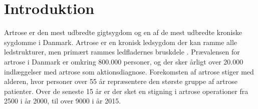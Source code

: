 
\raggedbottom



 \clearpage


\chapter{Introduktion}\vspace{-0.75cm}
Artrose er den mest udbredte gigtsygdom og en af de mest udbredte kroniske sygdomme i Danmark. 
Artrose er en kronisk ledsygdom der kan ramme alle ledstrukturer, men primært rammes ledfladernes bruskdele \citep{schroder}. Prævalensen for artrose i Danmark er omkring 800.000 personer, og der sker årligt over 20.000 indlæggelser med artrose som aktionsdiagnose. \citep{sygdom}
Forekomsten af artrose stiger med alderen, hvor personer over 55 år repræsentere den største gruppe af artrose patienter. Over de seneste 15 år er der sket en stigning i artrose operationer fra 2500 i år 2000, til over 9000 i år 2015. \citep{aarsrapport2016} \\

